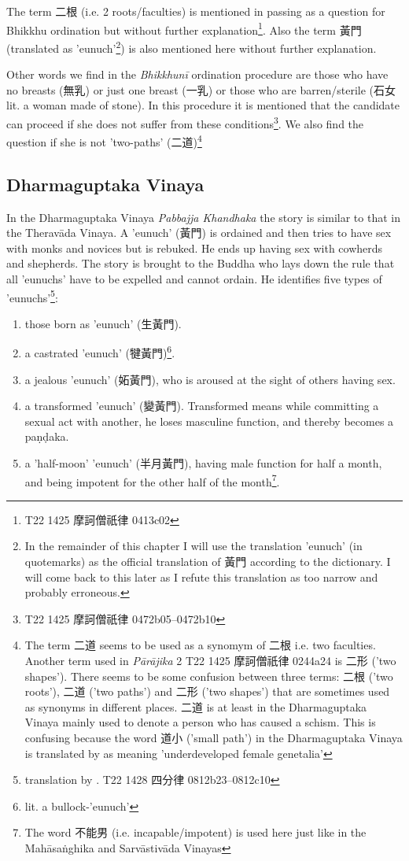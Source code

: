 The term 二根 (i.e. 2 roots/faculties) is mentioned in passing as a question for Bhikkhu ordination but without further explanation\footnote{T22 1425 摩訶僧祇律 0413c02}. Also the term 黃門 (translated as 'eunuch'\footnote{In the remainder of this chapter I will use the translation 'eunuch' (in quotemarks) as the official translation of 黃門 according to the dictionary. I will come back to this later as I refute this translation as too narrow and probably erroneous.}) is also mentioned here without further explanation.

Other words we find in the {\em Bhikkhunī} ordination procedure are those who have no breasts (無乳) or just one breast (一乳) or those who are barren/sterile (石女 lit. a woman made of stone). In this procedure it is mentioned that the candidate can proceed if she does not suffer from these conditions\footnote{T22 1425 摩訶僧祇律 0472b05–0472b10}. We also find the question if she is not ’two-paths’ (二道)\footnote{The term 二道 seems to be used as a synomym of 二根 i.e. two faculties. Another term used in {\em Pārājika} 2 T22 1425 摩訶僧祇律 0244a24 is 二形 ('two shapes'). There seems to be some confusion between three terms: 二根 ('two roots'), 二道 ('two paths') and 二形 ('two shapes') that are sometimes used as synonyms in different places. 二道 is at least in the Dharmaguptaka Vinaya mainly used to denote a person who has caused a schism. This is confusing because the word 道小 ('small path') in the Dharmaguptaka Vinaya is translated by \cite{bodhi} as meaning 'underdeveloped female genetalia'}

\subsection{Dharmaguptaka Vinaya}
In the Dharmaguptaka Vinaya {\em Pabbajja Khandhaka} the story is similar to that in the Theravāda Vinaya. A 'eunuch' (黃門) is ordained and then tries to have sex with monks and novices but is rebuked. He ends up having sex with cowherds and shepherds. The story is brought to the Buddha who lays down the rule that all 'eunuchs' have to be expelled and cannot ordain. He identifies five types of 'eunuchs'\footnote{translation by \cite{bodhi}. T22 1428 四分律 0812b23–0812c10}: 

\begin{enumerate}
\item those born as 'eunuch' (生黃門). 
\item a castrated 'eunuch' (犍黃門)\footnote{lit. a bullock-'eunuch'}.
\item a jealous 'eunuch' (妬黃門), who is aroused at the sight of others having sex.
\item a transformed 'eunuch' (變黃門). Transformed means while committing a sexual act with another, he loses masculine function, and thereby becomes a paṇḍaka.
\item a 'half-moon' 'eunuch' (半月黃門), having male function for half a month, and being impotent for the other half of the month\footnote{The word 不能男 (i.e. incapable/impotent) is used here just like in the Mahāsaṅghika and Sarvāstivāda Vinayas}.
\end{enumerate}

